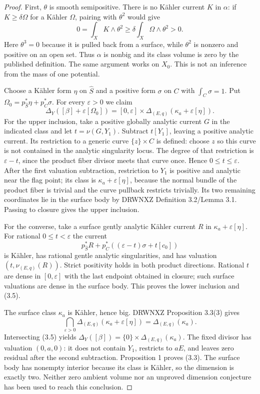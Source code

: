 \documentclass[11pt]{article}
\begin{document}
\begin{proof}
First, $\theta$ is smooth semipositive. There is no K\"ahler current $K$ in $\alpha$: if $K\geq\delta\Omega$ for a K\"ahler $\Omega$, pairing with $\theta^2$ would give
\[
 0=\int_X K\wedge\theta^2\geq\delta\int_X\Omega\wedge\theta^2>0.
\]
Here $\theta^3=0$ because it is pulled back from a surface, while $\theta^2$ is nonzero and positive on an open set. Thus $\alpha$ is nonbig and its class volume is zero by the published definition. The same argument works on $X_0$. This is not an inference from the mass of one potential.

Choose a K\"ahler form $\eta$ on $\widehat S$ and a positive form $\sigma$ on $C$ with $\int_C\sigma=1$. Put $\Omega_0=p_{\widehat S}^*\eta+p_C^*\sigma$. For every $\varepsilon>0$ we claim
\[
 \Delta_Y([\beta]+\varepsilon[\Omega_0])
 =[0,\varepsilon]\times\Delta_{(E,q)}(\kappa_a+\varepsilon[\eta]). \tag{3.5}
\]
For the upper inclusion, take a positive globally analytic current $G$ in the indicated class and let $t=\nu(G,Y_1)$. Subtract $t[Y_1]$, leaving a positive analytic current. Its restriction to a generic curve $\{z\}\times C$ is defined: choose $z$ so this curve is not contained in the analytic singularity locus. The degree of that restriction is $\varepsilon-t$, since the product fiber divisor meets that curve once. Hence $0\leq t\leq\varepsilon$. After the first valuation subtraction, restriction to $Y_1$ is positive and analytic near the flag point; its class is $\kappa_a+\varepsilon[\eta]$, because the normal bundle of the product fiber is trivial and the curve pullback restricts trivially. Its two remaining coordinates lie in the surface body by DRWNXZ Definition 3.2/Lemma 3.1. Passing to closure gives the upper inclusion.

For the converse, take a surface gently analytic K\"ahler current $R$ in $\kappa_a+\varepsilon[\eta]$. For rational $0\leq t<\varepsilon$ the current
\[
 p_{\widehat S}^*R+p_C^*((\varepsilon-t)\sigma+t[c_0])
\]
is K\"ahler, has rational gentle analytic singularities, and has valuation $(t,\nu_{(E,q)}(R))$. Strict positivity holds in both product directions. Rational $t$ are dense in $[0,\varepsilon]$ with the last endpoint obtained in closure; such surface valuations are dense in the surface body. This proves the lower inclusion and (3.5).

The surface class $\kappa_a$ is K\"ahler, hence big. DRWNXZ Proposition 3.3(3) gives
\[
 \bigcap_{\varepsilon>0}\Delta_{(E,q)}(\kappa_a+\varepsilon[\eta])
 =\Delta_{(E,q)}(\kappa_a).
\]
Intersecting (3.5) yields $\Delta_Y([\beta])=\{0\}\times\Delta_{(E,q)}(\kappa_a)$. The fixed divisor has valuation $(0,a,0)$: it does not contain $Y_1$, restricts to $aE$, and leaves zero residual after the second subtraction. Proposition 1 proves (3.3). The surface body has nonempty interior because its class is K\"ahler, so the dimension is exactly two. Neither zero ambient volume nor an unproved dimension conjecture has been used to reach this conclusion.


\end{proof}
\end{document}
